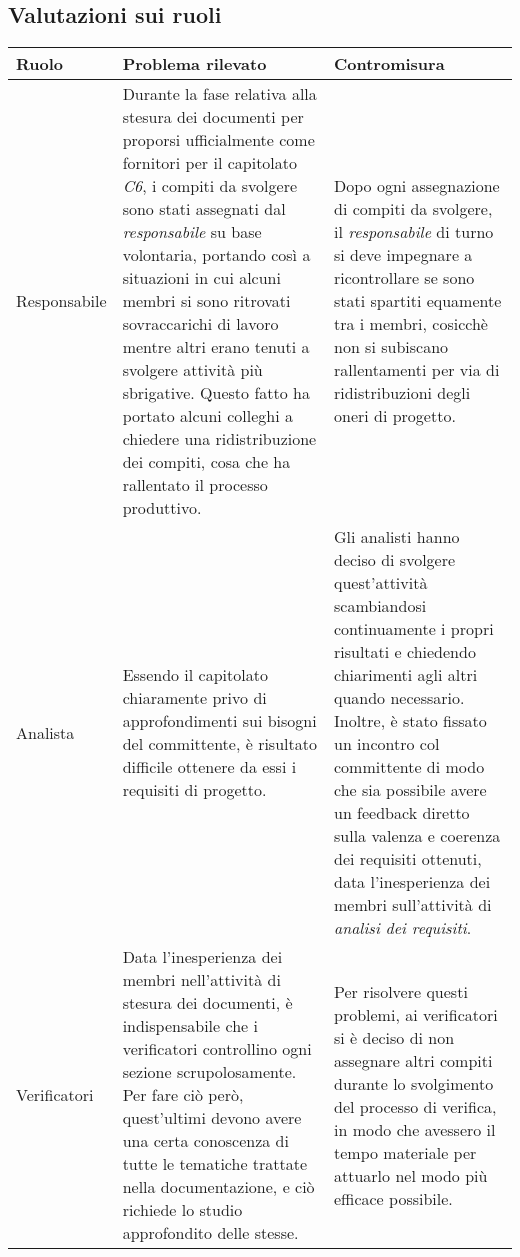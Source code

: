 	\subsection{Valutazioni sui ruoli}
	\begin{center}
	\begin{longtable}{|p{3cm}|p{6cm}|p{6cm}|}
	\hline
	\rowcolor{lighter-grayer}
	\textbf{Ruolo} & \textbf{Problema rilevato} & \textbf{Contromisura}\\
	\hline
	\endfirsthead


	\hline
	Responsabile
	 &
	Durante la fase relativa alla stesura dei documenti per proporsi ufficialmente come fornitori per il capitolato \textit{C6}, i compiti da svolgere sono stati assegnati dal \textit{responsabile} su base volontaria, portando così a situazioni in cui alcuni membri si sono ritrovati sovraccarichi di lavoro mentre altri erano tenuti a svolgere attività più sbrigative. Questo fatto ha portato alcuni colleghi a chiedere una ridistribuzione dei compiti, cosa che ha rallentato il processo produttivo. 
	 	& 
Dopo ogni assegnazione di compiti da svolgere, il \textit{responsabile} di turno si deve impegnare a ricontrollare se sono stati spartiti equamente tra i membri, cosicchè non si subiscano rallentamenti per via di ridistribuzioni degli oneri di progetto. \\
	\hline
	
		\hline
	Analista
	 &
	Essendo il capitolato chiaramente privo di approfondimenti sui bisogni del committente, è risultato difficile ottenere da essi i requisiti di progetto.
	 	& 
Gli analisti hanno deciso di svolgere quest'attività scambiandosi continuamente i propri risultati e chiedendo chiarimenti agli altri quando necessario. Inoltre, è stato fissato un incontro col committente di modo che sia possibile avere un feedback diretto sulla valenza e coerenza dei requisiti ottenuti, data l'inesperienza dei membri sull'attività di \textit{analisi dei requisiti}. \\
	\hline
	
		\hline
	Verificatori
	 &
Data l'inesperienza dei membri nell'attività di stesura dei documenti, è indispensabile che i verificatori controllino ogni sezione scrupolosamente. Per fare ciò però, quest'ultimi devono avere una certa conoscenza di tutte le tematiche trattate nella documentazione, e ciò richiede lo studio approfondito delle stesse.	 
	 	& 
Per risolvere questi problemi, ai verificatori si è deciso di non assegnare altri compiti durante lo svolgimento del processo di verifica, in modo che avessero il tempo materiale per attuarlo nel modo più efficace possibile. \\


\end{longtable}
\end{center}
